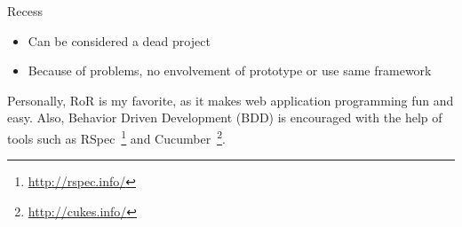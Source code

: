 Recess
\begin{itemize}
 \item Can be considered a dead project
 \item Because of problems, no envolvement of prototype or use same framework
\end{itemize}
Personally, RoR is my favorite, as it makes web application programming fun and easy. Also, Behavior Driven Development (BDD) is encouraged  with the help of tools such as RSpec~\footnote{\url{http://rspec.info/}} and Cucumber~\footnote{\url{http://cukes.info/}}.


